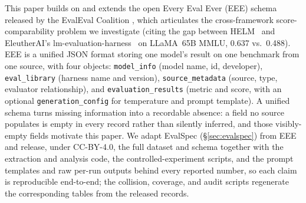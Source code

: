 \documentclass[11pt]{article}
\begin{document}
%

This paper builds on and extends the open Every Eval Ever (EEE) schema
released by the EvalEval Coalition
\citep{evaleval2026everyevalever}, which articulates the
cross-framework score-comparability problem we investigate (citing the
gap between HELM~\citep{liang2023helm} and EleutherAI's
lm-evaluation-harness~\citep{gao2024lmevalharness} on LLaMA~65B MMLU, 0.637
vs.\ 0.488).
EEE is a unified JSON format storing one model's result on one benchmark from one
source, with four objects: \texttt{model\_info} (model name, id, developer),
\texttt{eval\_library} (harness name and version), \texttt{source\_metadata}
(source, type, evaluator relationship), and \texttt{evaluation\_results} (metric and
score, with an optional \texttt{generation\_config} for temperature and prompt
template). A unified schema turns missing information into a recordable absence: a
field no source populates is empty in every record rather than silently inferred, and
those visibly-empty fields motivate this paper. We
adapt EvalSpec (\S\ref{sec:evalspec}) from EEE and release, under CC-BY-4.0, the
full dataset and schema together with the extraction and analysis code, the
controlled-experiment scripts, and the prompt templates and raw per-run outputs
behind every reported number, so each claim is reproducible end-to-end; the
collision, coverage, and audit scripts regenerate the corresponding tables from
the released records.
\end{document}
